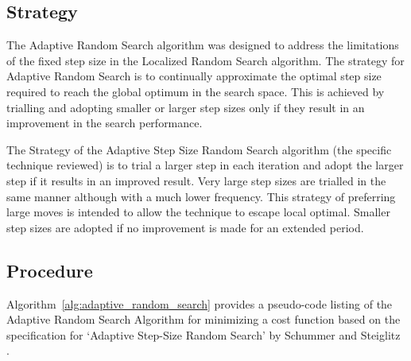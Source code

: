\subsection{Strategy}
The Adaptive Random Search algorithm was designed to address the limitations of the fixed step size in the Localized Random Search algorithm. The strategy for Adaptive Random Search is to continually approximate the optimal step size required to reach the global optimum in the search space. This is achieved by trialling and adopting smaller or larger step sizes only if they result in an improvement in the search performance.

The Strategy of the Adaptive Step Size Random Search algorithm (the specific technique reviewed) is to trial a larger step in each iteration and adopt the larger step if it results in an improved result. Very large step sizes are trialled in the same manner although with a much lower frequency. This strategy of preferring large moves is intended to allow the technique to escape local optimal. Smaller step sizes are adopted if no improvement is made for an extended period.

\subsection{Procedure}
Algorithm~\ref{alg:adaptive_random_search} provides a pseudo-code listing of the Adaptive Random Search Algorithm for minimizing a cost function based on the specification for `Adaptive Step-Size Random Search' by Schummer and Steiglitz \cite{Schumer1968}.

